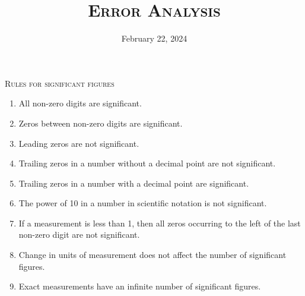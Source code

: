 \documentclass{article}
\title{\textsc{Error Analysis}}
\date{February 22, 2024}
\begin{document}
\maketitle
\begin{center}
\end{center}

\centering\textsc{Rules for significant figures}
\begin{enumerate}
    \item All non-zero digits are significant.
    \item Zeros between non-zero digits are significant.
    \item Leading zeros are not significant.
    \item Trailing zeros in a number without a decimal point are not significant.
    \item Trailing zeros in a number with a decimal point are significant.
    \item The power of 10 in a number in scientific notation is not significant.
    \item If a measurement is less than 1, then all zeros occurring to the left of the last non-zero digit are not significant.
    \item Change in units of measurement does not affect the number of significant figures.
    \item Exact measurements have an infinite number of significant figures.
\end{enumerate}

\vspace*{8mm}
\end{document}
